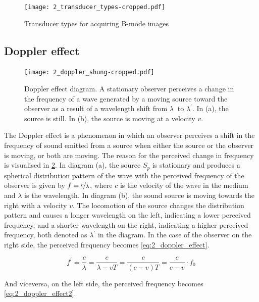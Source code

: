\begin{figure}[htbp]
	\centering
	\texttt{[image: 2\_transducer\_types-cropped.pdf]}
	\caption[Transducer types for acquiring B-mode images]{Transducer types for acquiring B-mode images \cite{JensenUltrasoundBook}}
	\label{fig:2_transducer_types}
\end{figure}

\subsection{Doppler effect} \label{sec:doppler_effect}

\begin{figure}[htbp]
	\centering
	\texttt{[image: 2\_doppler\_shung-cropped.pdf]}
	\caption[Doppler effect diagram]{Doppler effect diagram. A stationary observer perceives a change in the frequency of a wave generated by a moving source toward the observer as a result of a wavelength shift from $\lambda\ $ to $\lambda^{\prime}$. In (a), the source is still. In (b), the source is moving at a velocity $v$. \cite{ShungUltrasound_Book}}
	\label{fig:2_doppler_effect}
\end{figure}

The Doppler effect is a phenomenon in which an observer perceives a shift in the frequency of sound emitted from a source when either the source or the observer is moving, or both are moving. The reason for the perceived change in frequency is visualised in \cref{fig:2_doppler_effect}. In diagram (a), the source $S_{p}$ is stationary and produces a spherical distribution pattern of the wave with the perceived frequency of the observer is given by $f=\nicefrac{c}{\lambda}$, where $c$ is the velocity of the wave in the medium and $\lambda$ is the wavelength. In diagram (b), the sound source is moving towards the right with a velocity $v$. The locomotion of the source changes the distribution pattern and causes a longer wavelength on the left, indicating a lower perceived frequency, and a shorter wavelength on the right, indicating a higher perceived frequency, both denoted as $\lambda^{\prime}$ in the diagram. In the case of the observer on the right side, the perceived frequency becomes \cref{eq:2_doppler_effect}.

\begin{equation} \label{eq:2_doppler_effect}
	f^{\prime} = \frac{c}{\lambda} = \frac{c}{\lambda - v T} = \frac{c}{(c-v)T} = \frac{c}{c-v}\cdot f_{0}
\end{equation}

And viceversa, on the left side, the perceived frequency becomes \cref{eq:2_doppler_effect2}.

